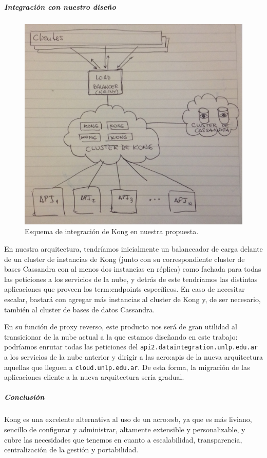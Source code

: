 \subparagraph{Integración con nuestro diseño}

\begin{figure}
  \includegraphics[width=\linewidth]{src/images/02-capitulo-2/tecnologias/kong/kong-arq.jpg}
  \caption{Esquema de integración de Kong en nuestra propuesta.}
  \label{fig:integracion-kong-arquitectura}
\end{figure}

En nuestra arquitectura, tendríamos inicialmente un balanceador de carga delante de un cluster de instancias de Kong (junto con su correspondiente cluster de bases Cassandra con al menos dos instancias en réplica) como fachada para todas las peticiones a los servicios de la nube, y detrás de este tendríamos las distintas aplicaciones que proveen los \glspl{term:endpoint} específicos. En caso de necesitar escalar, bastará con agregar más instancias al cluster de Kong y, de ser necesario, también al cluster de bases de datos Cassandra.

En su función de proxy reverso, este producto nos será de gran utilidad al transicionar de la nube actual a la que estamos diseñando en este trabajo: podríamos enrutar todas las peticiones del  \texttt{api2.dataintegration.unlp.edu.ar} a los servicios de la nube anterior y dirigir a las \glspl{acro:api} de la nueva arquitectura aquellas que lleguen a \texttt{cloud.unlp.edu.ar}. De esta forma, la migración de las aplicaciones cliente a la nueva arquitectura sería gradual.

\subparagraph{Conclusión}

Kong es una excelente alternativa al uso de un \gls{acro:esb}, ya que es más liviano, sencillo de configurar y administrar, altamente extensible y personalizable, y cubre las necesidades que tenemos en cuanto a escalabilidad, transparencia, centralización de la gestión y portabilidad.
